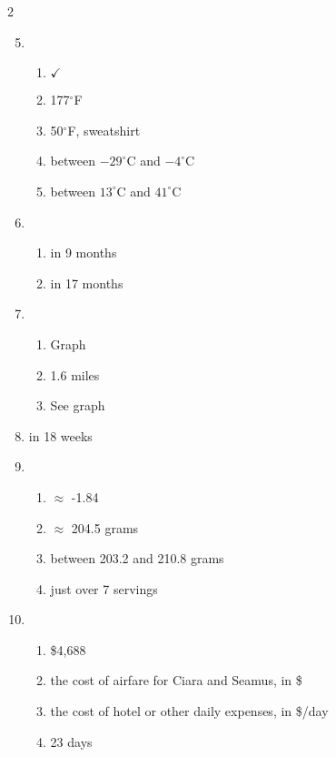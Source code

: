 \begin{multicols} {2}
\begin{enumerate}
\setcounter{enumi}{4}

\item %
\begin{enumerate}
\item $\checkmark$
\item 177$^\circ$F
\item 50$^\circ$F, sweatshirt
\item between $-29^\circ$C and $-4^\circ$C
\item between $13^\circ$C and $41^\circ$C
\end{enumerate}

\item %
\begin{enumerate}
\item in 9 months
\item in 17 months
\end{enumerate}

\item %
\begin{enumerate}
\item Graph
\item 1.6 miles
\item See graph
\end{enumerate}

\item %
in 18 weeks

\item %
\begin{enumerate}
\item $\approx$ -1.84
\item $\approx$ 204.5 grams
\item between 203.2 and 210.8 grams
\item just over 7 servings
\end{enumerate}

\item %
\begin{enumerate}
\item \$4,688
\item the cost of airfare for Ciara and Seamus, in \$
\item the cost of hotel or other daily expenses, in \$/day 
\item 23 days
\end{enumerate}

\end{enumerate}
\end{multicols}

